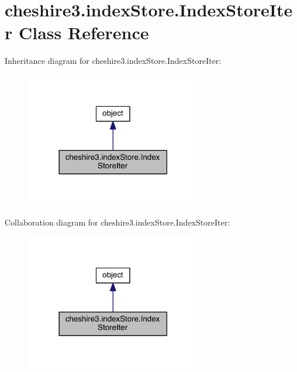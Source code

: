 \hypertarget{classcheshire3_1_1index_store_1_1_index_store_iter}{\section{cheshire3.\-index\-Store.\-Index\-Store\-Iter Class Reference}
\label{classcheshire3_1_1index_store_1_1_index_store_iter}
}


Inheritance diagram for cheshire3.\-index\-Store.\-Index\-Store\-Iter\-:
\nopagebreak
\begin{figure}[H]
\begin{center}
\leavevmode
\includegraphics[width=218pt]{classcheshire3_1_1index_store_1_1_index_store_iter__inherit__graph}
\end{center}
\end{figure}


Collaboration diagram for cheshire3.\-index\-Store.\-Index\-Store\-Iter\-:
\nopagebreak
\begin{figure}[H]
\begin{center}
\leavevmode
\includegraphics[width=218pt]{classcheshire3_1_1index_store_1_1_index_store_iter__coll__graph}
\end{center}
\end{figure}
